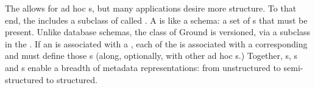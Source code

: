 \documentclass{sig-alternate}
\begin{document}
The \core allows for ad hoc {\gtag}s, but many applications desire more structure.
To that end, the \mantle includes a subclass of \thing called {\structure}. A \structure is like a schema: a set of {\gtag}s that must be present. Unlike database schemas, the \structure class of Ground is versioned, via a  subclass in the \core.  If an \thing is associated with a \structure, each \version of the \thing is associated with a corresponding  and must define those {\gtag}s (along, optionally, with other ad hoc {\gtag}s.)
Together, {\gtag}s, {\structure}s and s enable a breadth of metadata representations: from unstructured to semi-structured to structured.




\end{document}
